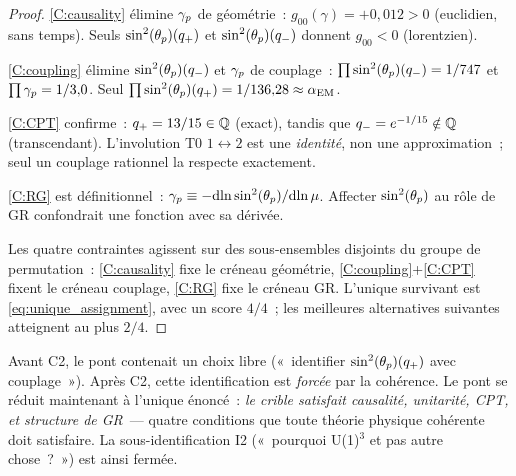 \documentclass[12pt,a4paper]{article}
\begin{document}
\begin{proof}
\ref{C:causality} élimine $\gamma_{p}$ de géométrie~:
$g_{00}(\gamma) = +0{,}012 > 0$ (euclidien, sans temps).
Seuls $\sin^2(\theta_{p})(q_{+})$ et $\sin^2(\theta_{p})(q_{-})$ donnent
$g_{00} < 0$ (lorentzien).

\ref{C:coupling} élimine $\sin^2(\theta_{p})(q_{-})$ et $\gamma_{p}$ de
couplage~: $\prod\sin^2(\theta_{p})(q_{-}) = 1/747$ et
$\prod\gamma_{p} = 1/3{,}0$. Seul
$\prod\sin^2(\theta_{p})(q_{+}) = 1/136{,}28 \approx \alpha_{\mathrm{EM}}$.

\ref{C:CPT} confirme~: $q_{+} = 13/15 \in \mathbb{Q}$
(exact), tandis que $q_{-} = e^{-1/15} \notin \mathbb{Q}$
(transcendant). L'involution T0 $1\leftrightarrow 2$ est une
\emph{identité}, non une approximation~; seul un couplage rationnel
la respecte exactement.

\ref{C:RG} est définitionnel~:
$\gamma_{p} \equiv -\mathrm{d}\!\ln\sin^2(\theta_{p})/\mathrm{d}\!\ln\mu$.
Affecter $\sin^2(\theta_{p})$ au rôle de GR confondrait une fonction avec sa
dérivée.

Les quatre contraintes agissent sur des sous-ensembles disjoints
du groupe de permutation~: \ref{C:causality} fixe le créneau
géométrie, \ref{C:coupling}+\ref{C:CPT} fixent le créneau couplage,
\ref{C:RG} fixe le créneau GR. L'unique survivant est
\eqref{eq:unique_assignment}, avec un score $4/4$~; les meilleures
alternatives suivantes atteignent au plus $2/4$.
\end{proof}

\begin{remarque}
\label{rem:C2_reduction}
Avant C2, le pont contenait un choix libre («~identifier
$\sin^2(\theta_{p})(q_{+})$ avec couplage~»). Après C2, cette identification
est \emph{forcée} par la cohérence. Le pont se réduit maintenant à
l'unique énoncé~: \emph{le crible satisfait causalité, unitarité,
CPT, et structure de GR}~--- quatre conditions que toute théorie
physique cohérente doit satisfaire. La sous-identification I2
(«~pourquoi U(1)$^3$ et pas autre chose~?~») est ainsi fermée.
\end{remarque}
\end{document}
